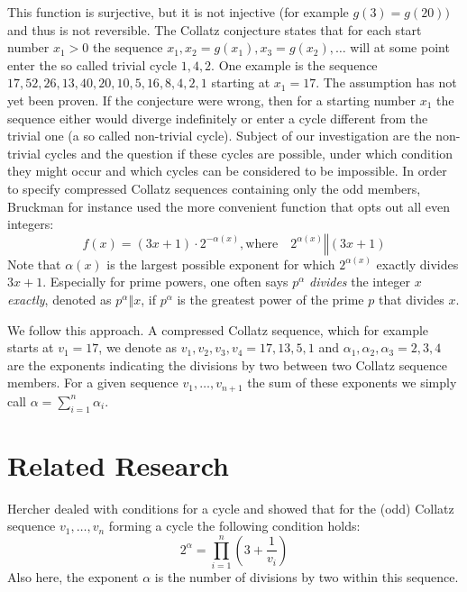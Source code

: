 This function is surjective, but it is not injective (for example $g(3)=g(20))$ and thus is not reversible. The Collatz conjecture states that for each start number $x_1>0$ the sequence $x_1,x_2=g(x_1),x_3=g(x_2),\ldots$ will at some point enter the so called trivial cycle $1,4,2$. One example is the sequence $17,52,26,13,40,20,10,5,16,8,4,2,1$ starting at $x_1=17$. The assumption has not yet been proven. If the conjecture were wrong, then for a starting number $x_1$ the sequence either would diverge indefinitely or enter a cycle different from the trivial one (a so called non-trivial cycle). Subject of our investigation are the non-trivial cycles and the question if these cycles are possible, under which condition they might occur and which cycles can be considered to be impossible.
In order to specify compressed Collatz sequences containing only the odd members, Bruckman \cite{Ref_Bruckman_2008} for instance used the more convenient function that opts out all even integers:
\begin{equation}
\label{eq:func_collatz_odd}
f(x)=(3x+1)\cdot2^{-\alpha(x)},\text{where}\hspace{1em}2^{\alpha(x)}\mathrel\Vert(3x+1)
\end{equation}
Note that $\alpha(x)$ is the largest possible exponent for which $2^{\alpha(x)}$ exactly divides $3x+1$. Especially for prime powers, one often says $p^\alpha$ \textit{divides} the integer $x$ \textit{exactly}, denoted as $p^\alpha\mathrel\Vert x$, if $p^\alpha$ is the greatest power of the prime $p$ that divides $x$.

We follow this approach. A compressed Collatz sequence, which for example starts at $v_1=17$, we denote as $v_1,v_2,v_3,v_4=17,13,5,1$ and $\alpha_1,\alpha_2,\alpha_3=2,3,4$ are the exponents indicating the divisions by two between two Collatz sequence members. For a given sequence $v_1,\ldots,v_{n+1}$ the sum of these exponents we simply call $\alpha=\sum_{i=1}^{n}\alpha_i$.

\section{Related Research}
\label{sec:1}
Hercher \cite{Ref_Hercher_2018} dealed with conditions for a cycle and showed that for the (odd) Collatz sequence $v_1,\ldots,v_n$ forming a cycle the following condition holds:
\[
2^\alpha=\prod_{i=1}^{n}\left(3+\frac{1}{v_i}\right)
\]
Also here, the exponent $\alpha$ is the number of divisions by two within this sequence.

